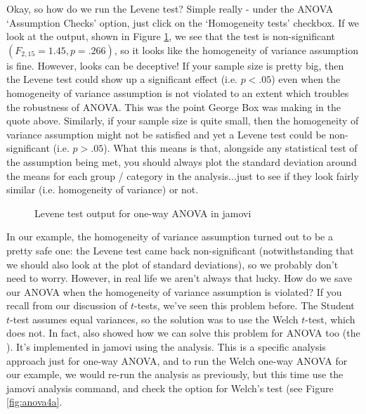 Okay, so how do we run the Levene test? Simple really - under the ANOVA `Assumption Checks' option, just click on the `Homogeneity tests' checkbox. If we look at the output, shown in Figure \ref{fig:anova4}, we see that the test is non-significant $(F_{2,15} = 1.45, p = .266)$, so it looks like the homogeneity of variance assumption is fine. However, looks can be deceptive! If your sample size is pretty big, then the Levene test could show up a significant effect (i.e. $p<.05$) even when the homogeneity of variance assumption is not violated to an extent which troubles the robustness of ANOVA. This was the point George Box was making in the quote above. Similarly, if your sample size is quite small, then the homogeneity of variance assumption might not be satisfied and yet a Levene test could be non-significant (i.e. $p>.05$). What this means is that, alongside any statistical test of the assumption being met, you should always plot the standard deviation around the means for each group / category in the analysis...just to see if they look fairly similar (i.e. homogeneity of variance) or not.

\begin{figure}[htb]
\begin{center}
\caption{Levene test output for one-way ANOVA in jamovi}
\HR
\label{fig:anova4}
\end{center}
\end{figure}


In our example, the homogeneity of variance assumption turned out to be a pretty safe one: the Levene test came back non-significant (notwithstanding that we should also look at the plot of standard deviations), so we probably don't need to worry. However, in real life we aren't always that lucky. How do we save our ANOVA when the homogeneity of variance assumption is violated? If you recall from our discussion of $t$-tests, we've seen this problem before. The Student $t$-test assumes equal variances, so the solution was to use the Welch $t$-test, which does not. In fact, \textcite{Welch1951} also showed how we can solve this problem for ANOVA too (the ). It's implemented in jamovi using the  analysis. This is a specific analysis approach just for one-way ANOVA, and to run the Welch one-way ANOVA for our example, we would re-run the analysis as previously, but this time use the jamovi  analysis command, and check the option for Welch's test (see Figure \ref{fig:anova4a}.

